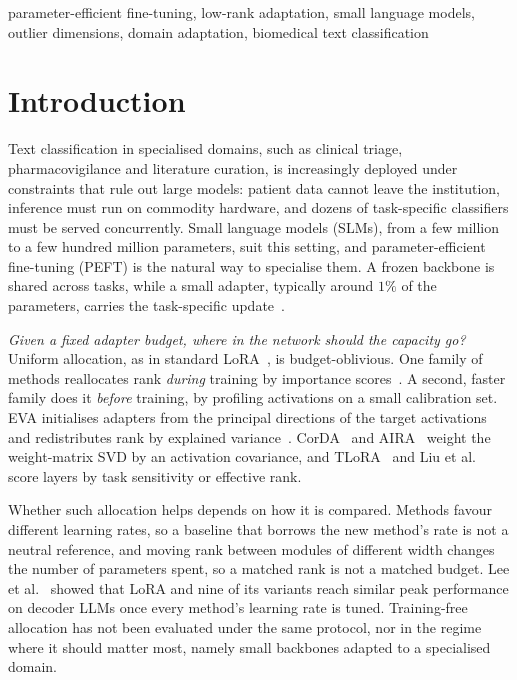 \documentclass[conference]{IEEEtran}
\begin{document}
\begin{IEEEkeywords}
parameter-efficient fine-tuning, low-rank adaptation, small language models,
outlier dimensions, domain adaptation, biomedical text classification
\end{IEEEkeywords}

\section{Introduction}

Text classification in specialised domains, such as clinical triage,
pharmacovigilance and literature curation, is increasingly deployed under
constraints that rule out large models: patient data cannot leave the
institution, inference must run on commodity hardware, and dozens of
task-specific classifiers must be served concurrently. Small language models
(SLMs), from a few million to a few hundred million parameters, suit this
setting, and parameter-efficient fine-tuning (PEFT) is the natural way to
specialise them. A frozen backbone is shared across tasks, while a small
adapter, typically around $1\%$ of the parameters, carries the task-specific
update~\cite{hu2022lora,han2024peftsurvey}.

\emph{Given a fixed adapter budget, where in the network should the capacity
go?} Uniform allocation, as in standard LoRA~\cite{hu2022lora}, is
budget-oblivious. One family of methods reallocates rank \emph{during} training
by importance scores~\cite{zhang2023adalora,ding2023sora,valipour2023dylora}. A
second, faster family does it \emph{before} training, by profiling activations on
a small calibration set. EVA initialises adapters from the principal directions
of the target activations and redistributes rank by explained
variance~\cite{paischer2025eva}. CorDA~\cite{yang2024corda} and
AIRA~\cite{li2025aira} weight the weight-matrix SVD by an activation covariance,
and TLoRA~\cite{lin2026tlora} and Liu et al.~\cite{liu2026rsprobe} score layers
by task sensitivity or effective rank.

Whether such allocation helps depends on how it is compared. Methods favour
different learning rates, so a baseline that borrows the new method's rate is not
a neutral reference, and moving rank between modules of different width changes
the number of parameters spent, so a matched rank is not a matched budget. Lee
et al.~\cite{lee2026lrmatters} showed that LoRA and nine of its variants reach
similar peak performance on decoder LLMs once every method's learning rate is
tuned. Training-free allocation has not been evaluated under the same protocol,
nor in the regime where it should matter most, namely small backbones adapted to
a specialised domain.
\end{document}
